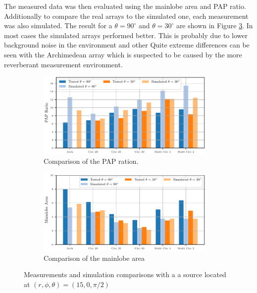 The measured data was then evaluated using the mainlobe area and PAP ratio. 
Additionally to compare the real arrays to the simulated one, each measurement
was also simulated.
The result for a $\theta = 90^\circ$ and $\theta = 30^\circ$ are shown in 
Figure \ref*{fig:TestSim}.
In most cases the simulated arrays performed better.
This is probably due to lower background noise in the environment and other 
Quite extreme differences can be seen with the Archimedean array which is 
suspected to be caused by the more reverberant measurement environment.
\begin{figure}[h]
	\centering
	\begin{subfigure}[b]{1\textwidth}
		\centering
		\includegraphics[width=0.95\textwidth]{images/5_array_evaluation/PapTestSim.pdf}
		\caption{Comparison of the PAP ration.}
		\label{fig:comp1}
	\end{subfigure}
	\begin{subfigure}[b]{1\textwidth}
		\centering
		\includegraphics[width=0.95\textwidth]{images/5_array_evaluation/AreaTestSim.pdf}
		\caption{Comparison of the mainlobe area}
		\label{fig:comp2}
	\end{subfigure}
	\caption{Measurements and simulation comparisons with a a source located at $(r, \phi, \theta) = (15, 0, \pi/2)$}
	\label{fig:TestSim}
\end{figure}

